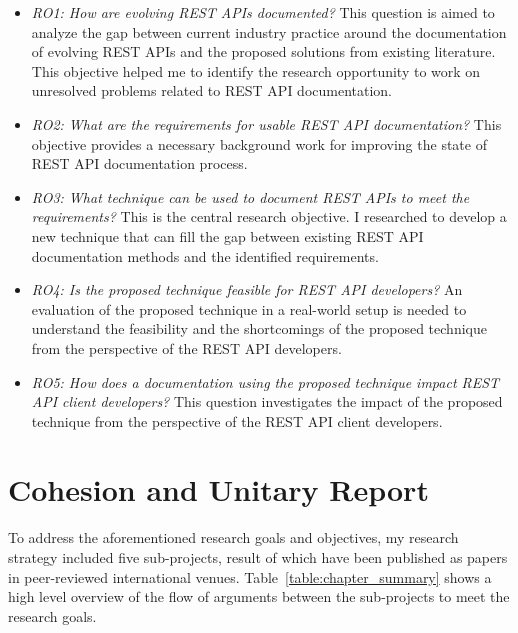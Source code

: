 \begin{itemize}
  \item \textit{RO1: How are evolving REST APIs documented?} This question is aimed to analyze the gap between current industry practice around the documentation of evolving REST APIs and the proposed solutions from existing literature. This objective helped me to identify the research opportunity to work on unresolved problems related to REST API documentation.
  \item \textit{RO2: What are the requirements for usable REST API documentation?} This objective provides a necessary background work for improving the state of REST API documentation process.
  \item \textit{RO3: What technique can be used to document REST APIs to meet the requirements?} This is the central research objective. I researched to develop a new technique that can fill the gap between existing REST API documentation methods and the identified requirements.
  \item \textit{RO4: Is the proposed technique feasible for REST API developers?} An evaluation of the proposed technique in a real-world setup is needed to understand the feasibility and the shortcomings of the proposed technique from the perspective of the REST API developers.
  \item \textit{RO5: How does a documentation using the proposed technique impact REST API client developers?} This question investigates the impact of the proposed technique from the perspective of the REST API client developers.
\end{itemize}

\section{Cohesion and Unitary Report}
To address the aforementioned research goals and objectives, my research strategy included five sub-projects, result of which have been published as papers in peer-reviewed international venues. Table~\ref{table:chapter_summary} shows a high level overview of the flow of arguments between the sub-projects to meet the research goals.

